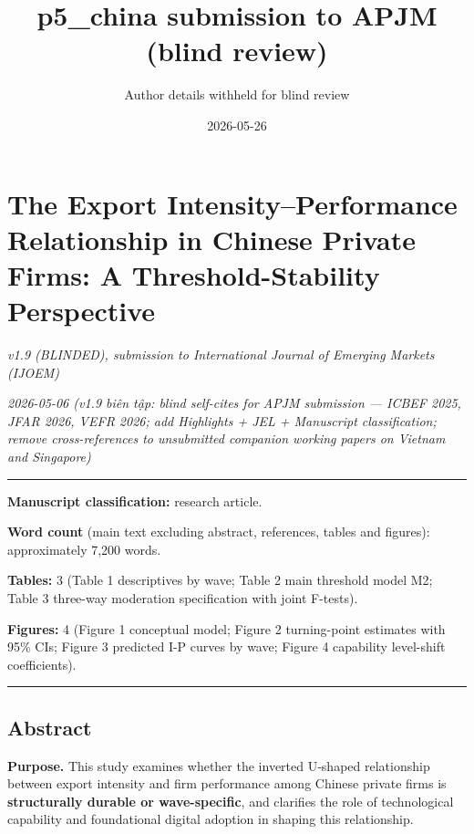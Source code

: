\documentclass[12pt,a4paper]{article}
\title{p5\_china submission to APJM (blind review)}
\author{Author details withheld for blind review}
\date{2026-05-26}
\begin{document}
\maketitle

\hypertarget{the-export-intensityperformance-relationship-in-chinese-private-firms-a-threshold-stability-perspective}{%
\section{The Export Intensity--Performance Relationship in Chinese
Private Firms: A Threshold-Stability
Perspective}\label{the-export-intensityperformance-relationship-in-chinese-private-firms-a-threshold-stability-perspective}}

\emph{v1.9 (BLINDED), submission to International Journal of Emerging
Markets (IJOEM)}

\emph{2026-05-06 (v1.9 biên tập: blind self-cites for APJM submission
--- ICBEF 2025, JFAR 2026, VEFR 2026; add Highlights + JEL + Manuscript
classification; remove cross-references to unsubmitted companion working
papers on Vietnam and Singapore)}

\begin{center}\rule{0.5\linewidth}{0.5pt}\end{center}

\textbf{Manuscript classification:} research article.

\textbf{Word count} (main text excluding abstract, references, tables
and figures): approximately 7,200 words.

\textbf{Tables:} 3 (Table 1 descriptives by wave; Table 2 main threshold
model M2; Table 3 three-way moderation specification with joint
F-tests).

\textbf{Figures:} 4 (Figure 1 conceptual model; Figure 2 turning-point
estimates with 95\% CIs; Figure 3 predicted I-P curves by wave; Figure 4
capability level-shift coefficients).

\begin{center}\rule{0.5\linewidth}{0.5pt}\end{center}

\hypertarget{abstract}{%
\subsection{Abstract}\label{abstract}}

\textbf{Purpose.} This study examines whether the inverted U‑shaped
relationship between export intensity and firm performance among Chinese
private firms is \textbf{structurally durable or wave-specific}, and
clarifies the role of technological capability and foundational digital
adoption in shaping this relationship.
\end{document}
